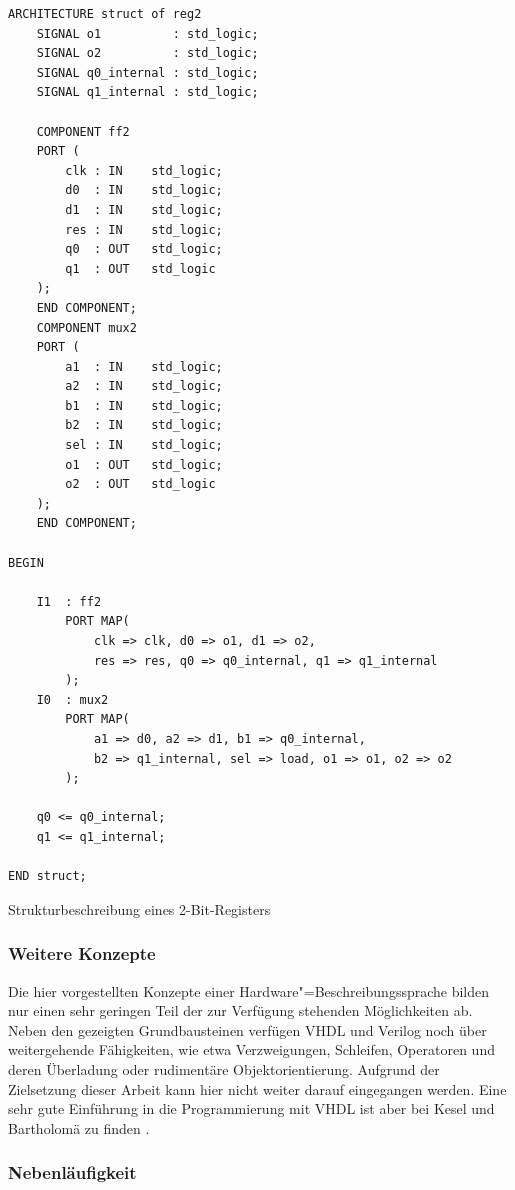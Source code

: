\begin{code}
    \begin{verbatim}
ARCHITECTURE struct of reg2
    SIGNAL o1          : std_logic;
    SIGNAL o2          : std_logic;
    SIGNAL q0_internal : std_logic;
    SIGNAL q1_internal : std_logic;

    COMPONENT ff2
    PORT (
        clk : IN    std_logic;
        d0  : IN    std_logic;
        d1  : IN    std_logic;
        res : IN    std_logic;
        q0  : OUT   std_logic;
        q1  : OUT   std_logic
    );
    END COMPONENT;
    COMPONENT mux2
    PORT (
        a1  : IN    std_logic;
        a2  : IN    std_logic;
        b1  : IN    std_logic;
        b2  : IN    std_logic;
        sel : IN    std_logic;
        o1  : OUT   std_logic;
        o2  : OUT   std_logic
    );
    END COMPONENT;

BEGIN

    I1  : ff2
        PORT MAP(
            clk => clk, d0 => o1, d1 => o2,
            res => res, q0 => q0_internal, q1 => q1_internal
        );
    I0  : mux2
        PORT MAP(
            a1 => d0, a2 => d1, b1 => q0_internal,
            b2 => q1_internal, sel => load, o1 => o1, o2 => o2
        );

    q0 <= q0_internal;
    q1 <= q1_internal;

END struct;
    \end{verbatim}
    \caption{Strukturbeschreibung eines 2-Bit-Registers \cite[siehe][36]{kesel2013}}
    \label{fpga:hdl:regstruct}
\end{code}
\noindent

\subsubsection{Weitere Konzepte}

Die hier vorgestellten Konzepte einer Hardware"=Beschreibungssprache bilden nur
einen sehr geringen Teil der zur Verfügung stehenden Möglichkeiten ab. Neben den
gezeigten Grundbausteinen verfügen VHDL und Verilog noch über weitergehende
Fähigkeiten, wie etwa Verzweigungen, Schleifen, Operatoren und deren Überladung
oder rudimentäre Objektorientierung. Aufgrund der Zielsetzung dieser Arbeit kann
hier nicht weiter darauf eingegangen werden. Eine sehr gute Einführung in die
Programmierung mit VHDL ist aber bei Kesel und Bartholomä zu finden
\cite[siehe][]{kesel2013}. 

\subsubsection{Nebenläufigkeit}

